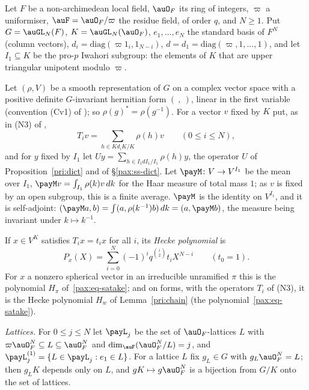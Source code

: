 \documentclass[10pt]{amsart}
\theoremstyle{definition}
\theoremstyle{remark}
\begin{document}
Let $F$ be a non-archimedean local field, $\auO_F$ its ring of integers, $\varpi$ a uniformiser,
$\auF=\auO_F/\varpi$ the residue field, of order $q$, and $N\ge1$. Put $G=\auGL_N(F)$, $K=\auGL_N(
\auO_F)$, $e_1,\dots,e_N$ the standard basis of $F^N$ (column vectors), $d_i=\mathrm{diag}(\varpi
1_i,1_{N-i})$, $d=d_1=\mathrm{diag}(\varpi,1,\dots,1)$, and let $I_1\subseteq K$ be the pro-$p$
Iwahori subgroup: the elements of $K$ that are upper triangular unipotent modulo $\varpi$.

Let $(\rho,V)$ be a smooth representation of $G$ on a complex vector space with a positive definite
$G$-invariant hermitian form $(\ ,\ )$, linear in the first variable (convention (Cv1) of
{\cite[\S2.1]{P51}}); so $\rho(g)^*=\rho(g^{-1})$. For a vector $v$ fixed by $K$ put, as in (N3)
of {\cite[\S6.1]{P49}},
\[
T_iv=\sum_{h\in Kd_iK/K}\rho(h)v\qquad(0\le i\le N),
\]
and for $y$ fixed by $I_1$ let $Uy=\sum_{h\in I_1dI_1/I_1}\rho(h)y$, the operator $U$ of
Proposition~\ref{pri:dict} and of \S\ref{pax:ss-dict}. Let $\payM\colon V\to V^{I_1}$ be the mean
over $I_1$, $\payM v=\int_{I_1}\rho(k)v\,dk$ for the Haar measure of total mass $1$; as $v$ is fixed
by an open subgroup, this is a finite average. $\payM$ is the identity on $V^{I_1}$, and it is
self-adjoint: $(\payM a,b)=\int(a,\rho(k^{-1})b)\,dk=(a,\payM b)$, the measure being invariant under
$k\mapsto k^{-1}$.

If $x\in V^K$ satisfies $T_ix=t_ix$ for all $i$, its \emph{Hecke polynomial} is
\begin{equation}\label{pay:eq-P}
P_x(X)=\sum_{i=0}^N(-1)^iq^{\binom i2}t_iX^{N-i}\qquad(t_0=1).
\end{equation}
For $x$ a nonzero spherical vector in an irreducible unramified $\pi$ this is the polynomial
$H_\pi$ of~\eqref{pax:eq-satake}; and on forms, with the operators $T_i$ of (N3), it is the Hecke polynomial $H_w$ of Lemma~\ref{pri:chain} (the polynomial~\eqref{pax:eq-satake}).

\emph{Lattices.} For $0\le j\le N$ let $\payL_j$ be the set of $\auO_F$-lattices $L$ with $\varpi
\auO_F^N\subseteq L\subseteq\auO_F^N$ and $\dim_\auF(\auO_F^N/L)=j$, and $\payL^{(1)}_j=\{L\in
\payL_j:e_1\in L\}$. For a lattice $L$ fix $g_L\in G$ with $g_L\auO_F^N=L$; then $g_LK$ depends only on
$L$, and $gK\mapsto g\auO_F^N$ is a bijection from $G/K$ onto the set of lattices.
\end{document}
